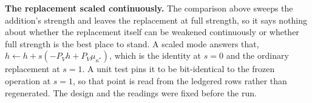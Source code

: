 \documentclass{article}
\begin{document}
%
\textbf{The replacement scaled continuously.} The comparison above sweeps the
addition's strength and leaves the replacement at full strength, so it says nothing about
whether the replacement itself can be weakened continuously or whether full strength is the
best place to stand. A scaled mode answers that, $h \leftarrow h + s(-P_Vh +
P_V\mu_{\kappa^{*}})$, which is the identity at $s=0$ and the ordinary replacement at
$s=1$. A unit test pins it to be bit-identical to the frozen operation at $s=1$, so
that point is read from the ledgered rows rather than regenerated. The design and the
readings were fixed before the run.
\end{document}
